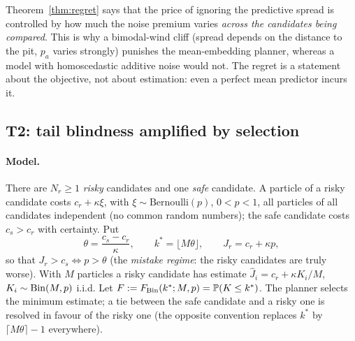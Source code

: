 \begin{remark}
Theorem~\ref{thm:regret} says that the price of ignoring the predictive spread is controlled by how much the noise premium varies \emph{across the candidates being compared}.
This is why a bimodal-wind cliff (spread depends on the distance to the pit, $p_a$ varies strongly) punishes the mean-embedding planner, whereas a model with homoscedastic additive noise would not.
The regret is a statement about the objective, not about estimation: even a perfect mean predictor incurs it.
\end{remark}

\subsection{T2: tail blindness amplified by selection}\label{sec:t2}

\paragraph{Model.}
There are $N_r\ge1$ \emph{risky} candidates and one \emph{safe} candidate.
A particle of a risky candidate costs $c_r+\kappa\xi$, with $\xi\sim\mathrm{Bernoulli}(p)$, $0<p<1$, all particles of all candidates independent (no common random numbers); the safe candidate costs $c_s>c_r$ with certainty.
Put
\[
\theta=\frac{c_s-c_r}{\kappa},\qquad k^*=\lfloor M\theta\rfloor,\qquad J_r=c_r+\kappa p,
\]
so that $J_r>c_s\iff p>\theta$ (the \emph{mistake regime}: the risky candidates are truly worse).
With $M$ particles a risky candidate has estimate $\hat J_i=c_r+\kappa K_i/M$, $K_i\sim\operatorname{Bin}(M,p)$ i.i.d.
Let $F:=F_{\operatorname{Bin}}(k^*;M,p)=\mathbb{P}(K\le k^*)$.
The planner selects the minimum estimate; a tie between the safe candidate and a risky one is resolved in favour of the risky one (the opposite convention replaces $k^*$ by $\lceil M\theta\rceil-1$ everywhere).

